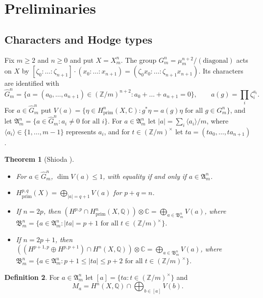 \documentclass[11pt]{amsart}
\newtheorem{theorem}{Theorem}[section]
\theoremstyle{definition}
\newtheorem{definition}[theorem]{Definition}
\theoremstyle{remark}
\numberwithin{equation}{section}
\newcommand{\Q}{\mathbb{Q}}
\newcommand{\C}{\mathbb{C}}
\newcommand{\Z}{\mathbb{Z}}
\newcommand{\fA}{\mathfrak{A}}
\newcommand{\fB}{\mathfrak{B}}
\begin{document}
\section{Preliminaries}\label{sec:prelim}

\subsection{Characters and Hodge types}\label{subsec:chars}
Fix $m\ge 2$ and $n\ge 0$ and put $X=X^n_m$. The group $G^n_m=\mu_m^{n+2}/(\text{diagonal})$ acts on $X$ by $[\zeta_0:\dots:\zeta_{n+1}]\cdot(x_0:\dots:x_{n+1})=(\zeta_0x_0:\dots:\zeta_{n+1}x_{n+1})$. Its characters are identified with
\[
\widehat G^n_m=\{a=(a_0,\dots,a_{n+1})\in(\Z/m)^{n+2}:a_0+\dots+a_{n+1}=0\},\qquad a(g)=\textstyle\prod_i\zeta_i^{a_i}.
\]
For $a\in\widehat G^n_m$ put $V(a)=\{\eta\in H^n_{\mathrm{prim}}(X,\C):g^*\eta=a(g)\eta\text{ for all }g\in G^n_m\}$, and let $\fA^n_m=\{a\in\widehat G^n_m: a_i\ne0\text{ for all }i\}$. For $a\in\fA^n_m$ let $|a|=\sum_i\langle a_i\rangle/m$, where $\langle a_i\rangle\in\{1,\dots,m-1\}$ represents $a_i$, and for $t\in(\Z/m)^\times$ let $ta=(ta_0,\dots,ta_{n+1})$.

\begin{theorem}[{Shioda \cite[Thm.~I]{Sh79}}]\label{thm:shiodaI}
\begin{itemize}
\item[(i)] For $a\in\widehat G^n_m$, $\dim V(a)\le1$, with equality if and only if $a\in\fA^n_m$.
\item[(ii)] $H^{p,q}_{\mathrm{prim}}(X)=\bigoplus_{|a|=q+1}V(a)$ for $p+q=n$.
\item[(iii)] If $n=2p$, then $(H^{p,p}\cap H^n_{\mathrm{prim}}(X,\Q))\otimes\C=\bigoplus_{a\in\fB^n_m}V(a)$, where $\fB^n_m=\{a\in\fA^n_m:|ta|=p+1\text{ for all }t\in(\Z/m)^\times\}$.
\item[(iv)] If $n=2p+1$, then $((H^{p+1,p}\oplus H^{p,p+1})\cap H^n(X,\Q))\otimes\C=\bigoplus_{a\in\fB^n_m}V(a)$, where $\fB^n_m=\{a\in\fA^n_m:p+1\le|ta|\le p+2\text{ for all }t\in(\Z/m)^\times\}$.
\end{itemize}
\end{theorem}

\begin{definition}\label{def:Ma}
For $a\in\fA^n_m$ let $[a]=\{ta:t\in(\Z/m)^\times\}$ and
\[
M_a=H^n(X,\Q)\cap\bigoplus_{b\in[a]}V(b).
\]
\end{definition}
\end{document}
